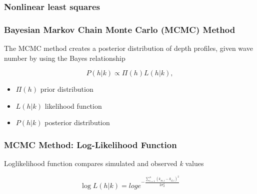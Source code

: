 \documentclass[7pt]{beamer}
\begin{document}

 \begin{frame}
\frametitle{Nonlinear least squares}


\end{frame}



 \begin{frame}
\frametitle{Bayesian Markov Chain Monte Carlo (MCMC) Method}
The MCMC method creates a posterior distribution of depth profiles, given wave number by using the Bayes relationship

\begin{equation}\label{bayes}
P(h|%
k) \propto \Pi(h)L(h|%
k),
\end{equation} 
\begin{itemize}
\item $\Pi(h)$  prior distribution
\item $L(h|%
k)$ likelihood function
\item $P(h|%
k)$ posterior distribution
\end{itemize}
\end{frame}

\begin{frame}
 \frametitle{MCMC Method: Log-Likelihood Function}
 Loglikelihood function compares simulated and observed \textit{k} values

\begin{equation} \label{likely}
\log{L(h|%
k)}=log{e^{- \frac{\sum\limits_{i=1}^n({k}_{m,i}-k_{d,i})^2}{2\sigma_{d}^2}}}
\end{equation} 


\end{frame}
\end{document}
